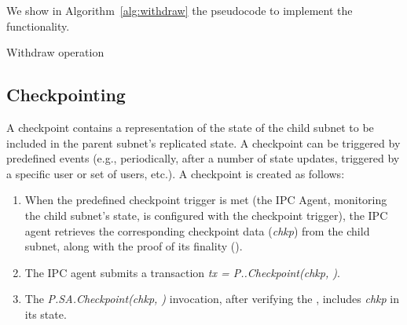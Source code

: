  We show in Algorithm~\ref{alg:withdraw} the pseudocode to implement the functionality. 

\begin{algorithm}[H]
\footnotesize
\caption{Withdraw operation}\label{alg:withdraw}
  \DontPrintSemicolon
   
\end{algorithm}
\label{enhancedFunc}

\subsection{Checkpointing} 
A checkpoint contains a representation of the state of the child subnet to be included in the parent subnet's replicated state. A checkpoint can be triggered by predefined events (e.g.,  periodically, after a number of state updates, triggered by a specific user or set of users, etc.).
A checkpoint is created as follows:
\begin{enumerate}
    \item When the predefined checkpoint trigger is met (the IPC Agent, monitoring the child subnet's state, is configured with the checkpoint trigger),
    the IPC agent retrieves the corresponding checkpoint data (\emph{chkp}) from the child subnet, along with the proof of its finality (\emph{\pof}).
    \item The IPC agent submits a transaction \emph{tx = P.\sa.Checkpoint(chkp, \pof)}.
    \item The \emph{P.SA.Checkpoint(chkp, \pof)} invocation, after verifying the \emph{\pof}, includes \emph{chkp} in its state.
\end{enumerate}

